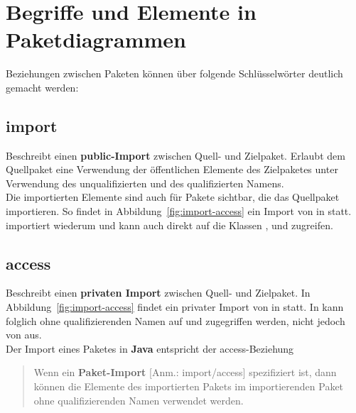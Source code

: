 \section{Begriffe und Elemente in Paketdiagrammen}

Beziehungen zwischen Paketen können über folgende Schlüsselwörter deutlich gemacht werden:

\subsection{\guillemotleft import\guillemotright}
Beschreibt einen \textbf{public-Import} zwischen Quell- und Zielpaket.
Erlaubt dem Quellpaket eine Verwendung der öffentlichen Elemente des Zielpaketes unter Verwendung des unqualifizierten und des qualifizierten Namens.\\
Die importierten Elemente sind auch für Pakete sichtbar, die das Quellpaket importieren.
So findet in Abbildung~\ref{fig:import-access} ein Import von  in  statt.  importiert wiederum  und kann auch direkt auf die Klassen ,  und  zugreifen.\\

\subsection{\guillemotleft access\guillemotright}
Beschreibt einen \textbf{privaten Import} zwischen Quell- und Zielpaket.
In Abbildung~\ref{fig:import-access} findet ein privater Import von  in  statt.
In  kann folglich ohne qualifizierenden Namen auf  und  zugegriffen werden, nicht jedoch von  aus.\\
Der Import eines Paketes in \textbf{Java} entspricht der \guillemotleft access\guillemotright-Beziehung

\blockquote[{\cite[307, Hervorhebung i.O.]{Bal05}}]{
Wenn ein \textbf{Paket-Import} [Anm.: import/access] spezifiziert ist, dann können die Elemente des importierten Pakets im importierenden Paket ohne qualifizierenden Namen verwendet werden.
}

